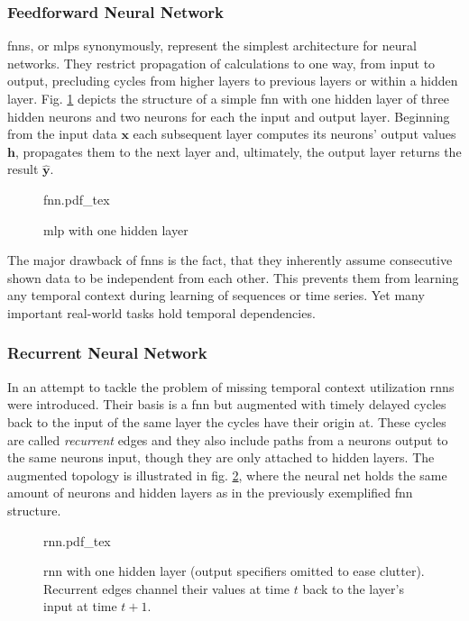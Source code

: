 \subsubsection{Feedforward Neural Network}
\glspl{fnn}, or \glspl{mlp} synonymously, represent the simplest architecture for neural networks.
They restrict propagation of calculations to one way, from input to output, precluding cycles from higher layers to previous layers or within a hidden layer.
Fig. \ref{fig:fnn} depicts the structure of a simple \gls{fnn} with one hidden layer of three hidden neurons and two neurons for each the input and output layer.
Beginning from the input data $\bm{x}$ each subsequent layer computes its neurons' output values $\bm{h}$, propagates them to the next layer and, ultimately, the output layer returns the result $\bm{\hat{y}}$.
\begin{figure}
	\centering
	\def\svgwidth{0.6\columnwidth}
         {fnn.pdf_tex}
         \caption{\gls{mlp} with one hidden layer}
	\label{fig:fnn}
\end{figure}

The major drawback of \glspl{fnn} is the fact, that they inherently assume consecutive shown data to be independent from each other.
This prevents them from learning any temporal context during learning of sequences or time series.
Yet many important real-world tasks hold temporal dependencies.

\subsubsection{Recurrent Neural Network}
In an attempt to tackle the problem of missing temporal context utilization \glspl{rnn} were introduced.
Their basis is a \gls{fnn} but augmented with timely delayed cycles back to the input of the same layer the cycles have their origin at.
These cycles are called \textit{recurrent} edges and they also include paths from a neurons output to the same neurons input, though they are only attached to hidden layers.
The augmented topology is illustrated in fig. \ref{fig:rnn}, where the neural net holds the same amount of neurons and hidden layers as in the previously exemplified \gls{fnn} structure.
\begin{figure}
	\centering
	\def\svgwidth{0.6\columnwidth}
         {rnn.pdf_tex}
         \caption{\gls{rnn} with one hidden layer (output specifiers omitted to ease clutter). Recurrent edges channel their values at time $t$ back to the layer's input at time $t+1$. }
	\label{fig:rnn}
\end{figure}


